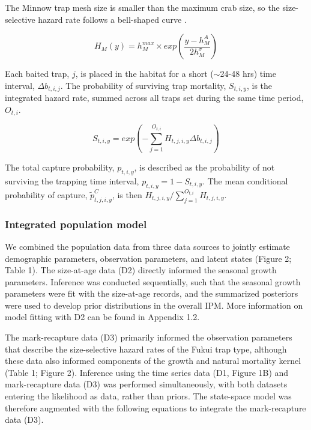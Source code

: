 \documentclass{article}
\begin{document}
The Minnow trap mesh size is smaller than the maximum crab size, so the size-selective hazard rate follows a bell-shaped curve \parencite{jorgensen2009size}.

\begin{equation}
H_M(y) = h^{max}_M \times exp(\frac{y-h^{A}_M}{2 h^{\sigma}_M})
\end{equation}

Each baited trap, $j$, is placed in the habitat for a short ($\sim$24-48 hrs) time interval, $\Delta b_{t,i,j}$. The probability of surviving trap mortality, $S_{t,i,y}$, is the integrated hazard rate, summed across all traps set during the same time period, $O_{t,i}$.

\begin{equation}
S_{t,i,y} = exp(-\sum_{j=1}^{O_{t,i}} H_{t,j,i,y}\Delta b_{t,i,j})
\end{equation}

The total capture probability, $p_{t,i,y}$, is described as the probability of not surviving the trapping time interval, $p_{t,i,y} = 1-S_{t,i,y}$. The mean conditional probability of capture, $\tilde{p}^C_{t,j,i,y}$, is then $H_{t,j,i,y}/\sum_{j=1}^{O_{t,i}}H_{t,j,i,y}$.

\subsubsection*{Integrated population model}

We combined the population data from three data sources to jointly estimate demographic parameters, observation parameters, and latent states (Figure 2; Table 1). The size-at-age data (D2) directly informed the seasonal growth parameters. Inference was conducted sequentially, such that the seasonal growth parameters were fit with the size-at-age records, and the summarized posteriors were used to develop prior distributions in the overall IPM. More information on model fitting with D2 can be found in Appendix 1.2. 

The mark-recapture data (D3) primarily informed the observation parameters that describe the size-selective hazard rates of the Fukui trap type, although these data also informed components of the growth and natural mortality kernel (Table 1; Figure 2). Inference using the time series data (D1, Figure 1B) and mark-recapture data (D3) was performed simultaneously, with both datasets entering the likelihood as data, rather than priors. The state-space model was therefore augmented with the following equations to integrate the mark-recapture data (D3).
\end{document}
